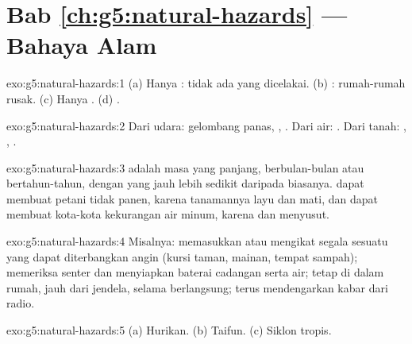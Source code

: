 \section*{Bab \ref{ch:g5:natural-hazards} --- Bahaya Alam}

\begin{solution}{exo:g5:natural-hazards:1}
(a) Hanya : tidak ada yang dicelakai. (b) : rumah-rumah
rusak. (c) Hanya . (d) .
\end{solution}

\begin{solution}{exo:g5:natural-hazards:2}
Dari udara: gelombang panas, , . Dari air: . Dari
tanah: ,  , .
\end{solution}

\begin{solution}{exo:g5:natural-hazards:3}
 adalah masa yang panjang, berbulan-bulan atau bertahun-tahun,
dengan  yang jauh lebih sedikit daripada biasanya.  dapat
membuat petani tidak panen, karena tanamannya layu dan mati, dan dapat
membuat kota-kota kekurangan air minum, karena  dan  menyusut.
\end{solution}

\begin{solution}{exo:g5:natural-hazards:4}
Misalnya: memasukkan atau mengikat segala sesuatu yang dapat diterbangkan
angin (kursi taman, mainan, tempat sampah); memeriksa senter dan menyiapkan
baterai cadangan serta air; tetap di dalam rumah, jauh dari jendela, selama
 berlangsung; terus mendengarkan kabar dari radio.
\end{solution}

\begin{solution}{exo:g5:natural-hazards:5}
(a) Hurikan. (b) Taifun. (c) Siklon tropis.
\end{solution}


